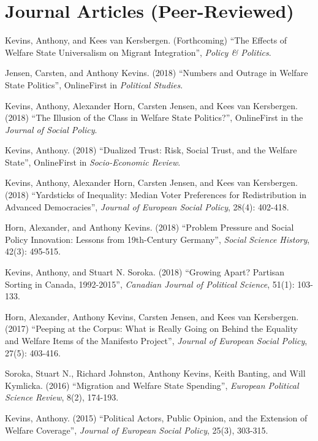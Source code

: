 \documentclass[letterpaper,fontsize=10pt]{scrartcl}
\newenvironment{modenumerate}
	  {\enumerate\setupmodenumerate}
	  {\endenumerate}
\newif\ifmoditem
\newcommand{\setupmodenumerate}{%
	  \global\moditemfalse
	  \let\origmakelabel\makelabel
	  \def\moditem##1{\global\moditemtrue\def\mesymbol{##1}\item}%
	  \def\makelabel##1{%
		\origmakelabel{##1\ifmoditem\rlap{\mesymbol}\fi\enspace}%
		\global\moditemfalse}%
	}
\begin{document}
	\section{Journal Articles (Peer-Reviewed)}
		\vspace{-1.5em}
		\begin{modenumerate}
				 \moditem{*}	Kevins, Anthony, and Kees van Kersbergen. (Forthcoming) ``The Effects of Welfare State Universalism on Migrant Integration'', \textit{Policy \& Politics}.
				\moditem{*}	Jensen, Carsten, and Anthony Kevins. (2018) ``Numbers and Outrage in Welfare State Politics'', OnlineFirst in \textit{Political Studies}.
				\item	Kevins, Anthony, Alexander Horn, Carsten Jensen, and Kees van Kersbergen. (2018) ``The Illusion of the Class in Welfare State Politics?'', OnlineFirst in the \textit{Journal of Social Policy}.
				\moditem{*} Kevins, Anthony. (2018) ``Dualized Trust: Risk, Social Trust, and the Welfare State'', OnlineFirst in \textit{Socio-Economic Review}.
				\moditem{*}	Kevins, Anthony, Alexander Horn, Carsten Jensen, and Kees van Kersbergen. (2018) ``Yardsticks of Inequality: Median Voter Preferences for Redistribution in Advanced Democracies'', \textit{Journal of European Social Policy}, 28(4): 402-418.
				\item Horn, Alexander, and Anthony Kevins. (2018) ``Problem Pressure and Social Policy Innovation: Lessons from 19th-Century Germany'', \textit{Social Science History}, 42(3): 495-515.
		  		\moditem{*} Kevins, Anthony, and Stuart N. Soroka. (2018) ``Growing Apart? Partisan Sorting in Canada, 1992-2015'', \textit{Canadian Journal of Political Science}, 51(1): 103-133.
		  		\moditem{*} Horn, Alexander, Anthony Kevins, Carsten Jensen, and Kees van Kersbergen. (2017) ``Peeping at the Corpus: What is Really Going on Behind the Equality and Welfare Items of the Manifesto Project'', \textit{Journal of European Social Policy}, 27(5): 403-416.
		  		\moditem{*} Soroka, Stuart N., Richard Johnston, Anthony Kevins, Keith Banting, and Will Kymlicka. (2016) ``Migration and Welfare State Spending'', \textit{European Political Science Review}, 8(2), 174-193.
				\moditem{*} Kevins, Anthony. (2015) ``Political Actors, Public Opinion, and the Extension of Welfare Coverage'', \textit{Journal of European Social Policy}, 25(3), 303-315.
		\end{modenumerate}
	
	\vspace{-1em}
\end{document}
